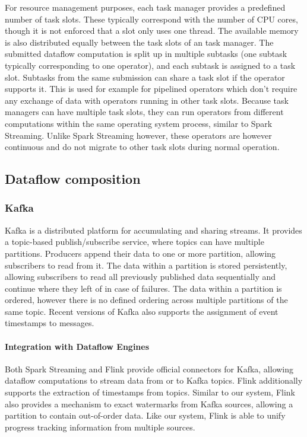 For resource management purposes, each task manager provides
a predefined number of task slots. These typically correspond with the number of CPU cores,
though it is not enforced that a slot only uses one thread. The available memory is also distributed
equally between the task slots of an task manager. The submitted dataflow computation is split up
in multiple subtasks (one subtask typically corresponding to one operator), and each subtask is assigned
to a task slot. Subtasks from the same submission can share a task slot
if the operator supports it. This is used for example for pipelined operators which don't
require any exchange of data with operators running in other task slots.
Because task managers can have multiple task slots, they can run operators from different
computations within the same operating system process, similar to Spark Streaming.
Unlike Spark Streaming however, these operators are however continuous and
do not migrate to other task slots during normal operation.

\subsection{Dataflow composition}

\subsubsection{Kafka}

Kafka \cite{kafka} is a distributed platform for accumulating and sharing streams. It provides
a topic-based publish/subscribe service, where topics can have multiple partitions. Producers append
their data to one or more partition, allowing subscribers to read from it.
The data within a partition is stored persistently, allowing subscribers to
read all previously published data sequentially and continue where they left
of in case of failures. The data within a partition is ordered, however there
is no defined ordering across multiple partitions of the same topic. Recent
versions of Kafka also supports the assignment of event timestamps to messages.

\paragraph{Integration with Dataflow Engines}

Both Spark Streaming and Flink provide official connectors for Kafka, allowing
dataflow computations to stream data from or to Kafka topics. Flink additionally supports
the extraction of timestamps from topics. Similar to our system, Flink also provides a
mechanism to exact watermarks from Kafka sources, allowing a partition
to contain out-of-order data. Like our system, Flink is able to unify
progress tracking information from multiple sources.

